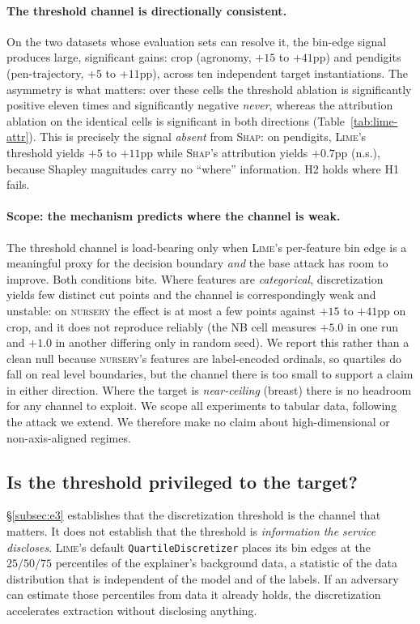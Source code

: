 \documentclass[sigconf,anonymous,review]{acmart}
\begin{document}
\paragraph{The threshold channel is directionally consistent.} On the two datasets whose evaluation
sets can resolve it, the bin-edge signal produces large, significant gains: crop (agronomy, $+15$ to
$+41$pp) and pendigits (pen-trajectory, $+5$ to $+11$pp), across ten independent target
instantiations. The asymmetry is what matters: over these cells the threshold ablation is
significantly positive eleven times and significantly negative \emph{never}, whereas the attribution
ablation on the identical cells is significant in both directions
(Table~\ref{tab:lime-attr}). This is precisely the signal \emph{absent} from \textsc{Shap}: on
pendigits, \textsc{Lime}'s threshold yields $+5$ to $+11$pp while \textsc{Shap}'s attribution yields
$+0.7$pp (n.s.), because Shapley magnitudes carry no ``where'' information. H2 holds where H1 fails.

\paragraph{Scope: the mechanism predicts where the channel is weak.} The threshold channel is
load-bearing only when \textsc{Lime}'s per-feature bin edge is a meaningful proxy for the decision
boundary \emph{and} the base attack has room to improve. Both conditions bite. Where features are
\emph{categorical}, discretization yields few distinct cut points and the channel is correspondingly
weak and unstable: on \textsc{nursery} the effect is at most a few points against $+15$ to $+41$pp on
crop, and it does not reproduce reliably (the NB cell measures $+5.0$ in one run and $+1.0$ in another differing only in random seed). We report this rather than a clean null because
\textsc{nursery}'s features are label-encoded ordinals, so quartiles do fall on real level boundaries, but the channel there is too small to support a claim in either direction. Where the target is \emph{near-ceiling} (breast) there is
no headroom for any channel to exploit. We scope all experiments to tabular data, following the attack we extend. We therefore make no claim about high-dimensional or non-axis-aligned regimes.

\subsection{Is the threshold privileged to the target?}
\label{subsec:e5}
\S\ref{subsec:e3} establishes that the discretization threshold is the channel that matters. It does
not establish that the threshold is \emph{information the service discloses}. \textsc{Lime}'s default
\texttt{QuartileDiscretizer} places its bin edges at the $25/50/75$ percentiles of the explainer's background data, a statistic of the data distribution that is independent of the model and of the
labels. If an adversary can estimate those percentiles from data it already holds, the discretization
accelerates extraction without disclosing anything.
\end{document}
